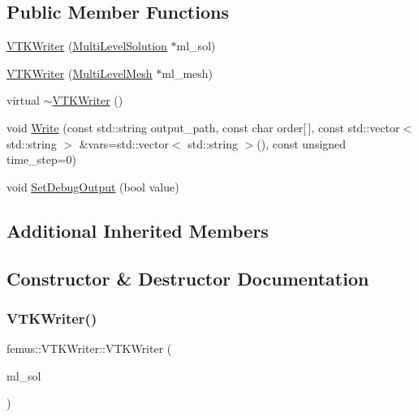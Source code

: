 \subsection*{Public Member Functions}
\begin{DoxyCompactItemize}
\item 
\mbox{\hyperlink{classfemus_1_1_v_t_k_writer_a8762f98d86aa6f0ca17ca9069924c61c}{V\+T\+K\+Writer}} (\mbox{\hyperlink{classfemus_1_1_multi_level_solution}{Multi\+Level\+Solution}} $\ast$ml\+\_\+sol)
\item 
\mbox{\hyperlink{classfemus_1_1_v_t_k_writer_af6e64618dd694f0c89e3ce43397548c7}{V\+T\+K\+Writer}} (\mbox{\hyperlink{classfemus_1_1_multi_level_mesh}{Multi\+Level\+Mesh}} $\ast$ml\+\_\+mesh)
\item 
virtual \mbox{\hyperlink{classfemus_1_1_v_t_k_writer_a31480113c98d9be5593af31ef2fcd67a}{$\sim$\+V\+T\+K\+Writer}} ()
\item 
void \mbox{\hyperlink{classfemus_1_1_v_t_k_writer_a91486b781799b8721f4a3a4099392be5}{Write}} (const std\+::string output\+\_\+path, const char order\mbox{[}$\,$\mbox{]}, const std\+::vector$<$ std\+::string $>$ \&vars=std\+::vector$<$ std\+::string $>$(), const unsigned time\+\_\+step=0)
\item 
void \mbox{\hyperlink{classfemus_1_1_v_t_k_writer_af6eea80a3b7348bf2066c1150ead1bc8}{Set\+Debug\+Output}} (bool value)
\end{DoxyCompactItemize}
\subsection*{Additional Inherited Members}


\subsection{Constructor \& Destructor Documentation}
\mbox{\label{classfemus_1_1_v_t_k_writer_a8762f98d86aa6f0ca17ca9069924c61c}} 
\subsubsection{\texorpdfstring{V\+T\+K\+Writer()}{VTKWriter()}\hspace{0.1cm}{\footnotesize\ttfamily [1/2]}}
{\footnotesize\ttfamily femus\+::\+V\+T\+K\+Writer\+::\+V\+T\+K\+Writer (\begin{DoxyParamCaption}\item[{\mbox{\hyperlink{classfemus_1_1_multi_level_solution}{Multi\+Level\+Solution}} $\ast$}]{ml\+\_\+sol }\end{DoxyParamCaption})}

